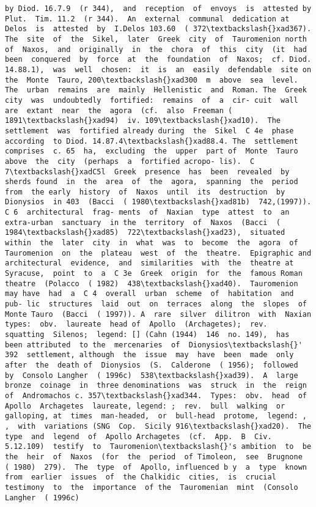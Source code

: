 \documentclass[11pt]{article}
\begin{document}
\begin{Verbatim}[commandchars=\\\{\}]
by Diod. 16.7.9  (r 344),  and  reception  of  envoys  is  attested by Plut.  Tim. 11.2  (r 344).  An  external  communal  dedication at  Delos  is  attested  by  I.Delos 103.60  ( 372\textbackslash{}xad367). The  site  of  the  Sikel,  later  Greek  city  of  Tauromenion north  of  Naxos,  and  originally  in  the  chora  of  this  city  (it  had been  conquered  by  force  at  the  foundation  of  Naxos;  cf. Diod. 14.88.1),  was  well  chosen:  it  is  an  easily  defendable  site on  the  Monte  Tauro, 200\textbackslash{}xad300  m  above  sea  level. The  urban  remains  are  mainly  Hellenistic  and  Roman. The  Greek  city  was  undoubtedly  fortified:  remains  of  a  cir- cuit  wall  are  extant  near  the  agora  (cf.  also  Freeman ( 1891\textbackslash{}xad94)  iv. 109\textbackslash{}xad10).  The  settlement  was  fortified already during  the  Sikel  C 4e  phase  according  to Diod. 14.87.4\textbackslash{}xad88.4. The  settlement  comprises  c. 65  ha,  excluding  the  upper  part of  Monte  Tauro  above  the  city  (perhaps  a  fortified acropo- lis).  C 7\textbackslash{}xadC5l  Greek  presence  has  been  revealed  by  sherds found  in  the  area  of  the  agora,  spanning  the  period  from  the early  history  of  Naxos  until  its  destruction  by  Dionysios  in 403  (Bacci  ( 1980\textbackslash{}xad81b)  742,(1997)).  C 6  architectural  frag- ments  of  Naxian  type  attest  to  an  extra-urban  sanctuary  in the  territory  of  Naxos  (Bacci  ( 1984\textbackslash{}xad85)  722\textbackslash{}xad23),  situated within  the  later  city  in  what  was  to  become  the  agora  of Tauromenion  on  the  plateau  west  of  the  theatre.  Epigraphic and  architectural  evidence,  and  similarities  with  the  theatre at  Syracuse,  point  to  a  C 3e  Greek  origin  for  the  famous Roman  theatre  (Polacco  ( 1982)  438\textbackslash{}xad40).  Tauromenion  may have  had  a  C 4  overall  urban  scheme  of  habitation  and  pub- lic  structures  laid  out  on  terraces  along  the  slopes  of  Monte Tauro  (Bacci  ( 1997)). A  rare  silver  dilitron  with  Naxian  types:  obv.  laureate  head of  Apollo  (Archagetes);  rev.  squatting  Silenos;  legend: [] (Cahn (1944)  146  no. 149),  has  been attributed  to the  mercenaries  of  Dionysios\textbackslash{}' 392  settlement, although  the  issue  may  have  been  made  only  after  the  death of  Dionysios  (S.  Calderone  ( 1956);  followed  by  Consolo Langher  ( 1996c)  538\textbackslash{}xad39).  A  large  bronze  coinage  in  three denominations  was  struck  in  the  reign  of  Andromachos c. 357\textbackslash{}xad344.  Types:  obv.  head  of  Apollo  Archagetes  laureate, legend: ;  rev.  bull  walking  or  galloping, at  times  man-headed,  or  bull-head  protome,  legend: ,  ,  with  variations (SNG  Cop.  Sicily 916\textbackslash{}xad20).  The  type  and  legend  of  Apollo Archagetes  (cf.  App.  B  Civ. 5.12.109)  testify  to  Tauromenion\textbackslash{}'s ambition  to  be  the  heir  of  Naxos  (for  the  period  of Timoleon,  see  Brugnone  ( 1980)  279).  The  type  of  Apollo, influenced b y  a  type  known  from  earlier  issues  of  the Chalkidic  cities,  is  crucial  testimony  to  the  importance  of the  Tauromenian  mint  (Consolo  Langher  ( 1996c)  
\end{Verbatim}
\end{document}
